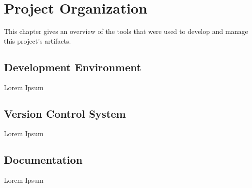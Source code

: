 
\chapter{Project Organization}

\label{AppendixA}

This chapter gives an overview of the tools that were used to develop and manage this project’s artifacts.

\section{Development Environment}

Lorem Ipsum

\section{Version Control System}

Lorem Ipsum

\section{Documentation}

Lorem Ipsum
